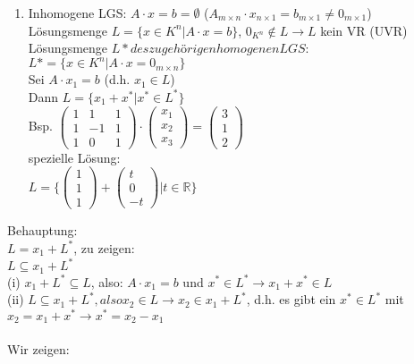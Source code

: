 \documentclass{scrartcl}
\begin{document}
\begin{enumerate}
	
	\item
	Inhomogene LGS: $A \cdot x = b = \emptyset$ ($A_{m\times n} \cdot x_{n \times 1} = b_{m \times 1} \not = 0_{m \times 1}$)
	\\
	Lösungsmenge $L = \{ x \in K^n \vert A \cdot x = b \}$, $0_{K^n} \not \in L \rightarrow L$ kein VR (UVR)\\
	Lösungsmenge $L* des zugehörigen homogenen LGS:$\\
	$L* = \{ x \in K^n \vert A \cdot x = 0_{m \times n} \}$\\
	Sei $A \cdot x_1 = b$ (d.h. $x_1 \in L$)\\
	Dann $L = \{ x_1 + x^* \vert x^* \in L^* \}$ \\
	Bsp. $\begin{pmatrix}
		1 & 1 & 1 \\ 1 & -1 & 1 \\ 1 & 0 & 1
	\end{pmatrix} \cdot \begin{pmatrix}
		x_1 \\ x_2 \\ x_3
	\end{pmatrix} = \begin{pmatrix}
		3 \\ 1 \\ 2
	\end{pmatrix}$\\
	spezielle Lösung: \\
	$L = \{ \begin{pmatrix}
		1 \\ 1 \\ 1 
	\end{pmatrix} + \begin{pmatrix}
		t \\ 0 \\ -t
	\end{pmatrix} \vert t \in \mathbb{R} \}$
\end{enumerate}
\newpage
Behauptung:\\
$L= x_1 + L^*$, zu zeigen:\\
$L \subseteq x_1 + L^*$ \\
(i) $x_1 + L^* \subseteq L$, also: $A \cdot x_1 = b$ und $x^* \in L^* \rightarrow x_1+x^* \in L$\\
(ii) $L \subseteq x_1 + L^*, also x_2 \in L \rightarrow x_2 \in x_1 + L^*$, d.h. es gibt ein $x^* \in L^*$ mit $x_2 = x_1 + x^* \rightarrow x^* = x_2-x_1$\\\\
Wir zeigen:\\
\end{document}
